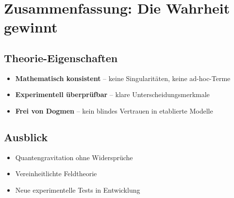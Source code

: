 \section{Zusammenfassung: Die Wahrheit gewinnt}
\subsection{Theorie-Eigenschaften}
\begin{itemize}
\item \textbf{Mathematisch konsistent} – keine Singularitäten, keine ad-hoc-Terme
\item \textbf{Experimentell überprüfbar} – klare Unterscheidungsmerkmale
\item \textbf{Frei von Dogmen} – kein blindes Vertrauen in etablierte Modelle
\end{itemize}

\subsection{Ausblick}
\begin{itemize}
\item Quantengravitation ohne Widersprüche
\item Vereinheitlichte Feldtheorie
\item Neue experimentelle Tests in Entwicklung
\end{itemize}